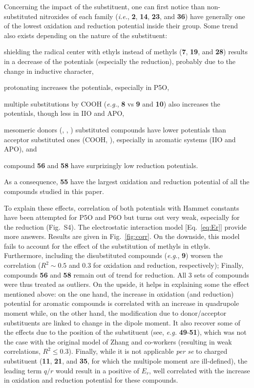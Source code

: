 \documentclass[review]{elsarticle}
\begin{document}
Concerning the impact of the substituent, one can first notice than non-substituted nitroxides of each family (\textit{i.e.}, \textbf{2}, \textbf{14}, \textbf{23}, and \textbf{36}) have generally one of the lowest oxidation and reduction potential inside their group. Some trend also exists depending on the nature of the substituent: \begin{inparaenum}[(i)]
	\item shielding the radical center with ethyls instead of methyls (\textbf{7}, \textbf{19}, and \textbf{28}) results in a decrease of the potentials (especially the reduction), probably due to the change in inductive character, 
	\item  protonating  increases the potentials, especially in P5O,
	\item multiple substitutions by COOH (\textit{e.g.},  \textbf{8} vs \textbf{9} and \textbf{10}) also increases the potentials, though less in IIO and APO, 
	\item mesomeric donors (, , ) substituted compounds have lower potentials than acceptor substituted ones (COOH, ), especially in aromatic systems (IIO and APO), and
	\item  compound \textbf{56} and \textbf{58} have surprizingly low reduction potentials.
\end{inparaenum}
As a consequence, \textbf{55} have the largest oxidation and reduction potential of all the compounds studied in this paper.

To explain these effects, correlation of both potentials with Hammet constants have been attempted for P5O and P6O but turns out very weak, especially for the reduction (Fig.~S4).  The electrostatic interaction model [Eq.~\eqref{eq:Er}] provide more answers. Results are given in Fig.~\ref{fig:corr}. On the downside, this model fails to account for the effect of the substitution of methyls in ethyls.  Furthermore, including the disubstituted compounds (\textit{e.g.}, \textbf{9}) worsen the correlation ($R^2 \sim 0.5$ and 0.3 for oxidation and reduction, respectively); Finally, compounds \textbf{56} and \textbf{58} remain out of trend for reduction. All  3 sets of compounds were thus treated as outliers. On the upside, it helps in explaining some the effect mentioned above: on the one hand, the increase in oxidation (and reduction) potential for aromatic compounds is correlated with an increase in quadrupole moment while, on the other hand, the modification due to donor/acceptor substituents are linked to change in the dipole moment. It also recover some of the effects due to the position of the substituent (see, \textit{e.g.} \textbf{49}-\textbf{51}), which was not  the case with the original model of Zhang and co-workers (resulting in weak correlations, $R^2\leq 0.3$).  Finally, while it is not applicable \textit{per se} to charged substituent (\textbf{11}, \textbf{21}, and \textbf{35}, for which the multipole moment are ill-defined), the leading term $q/r$ would result in a positive of $E_r$, well correlated with the increase in oxidation and reduction potential for these compounds. 
\end{document}
